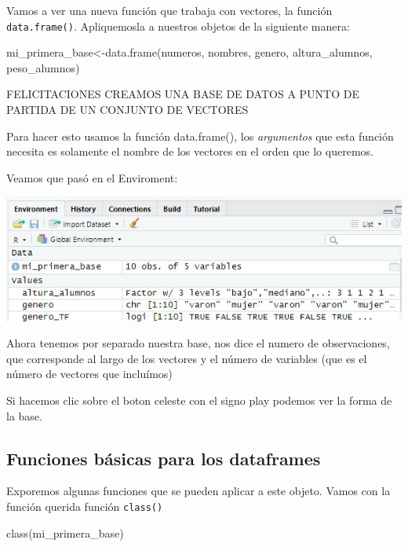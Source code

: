 \documentclass[
]{book}
\newenvironment{Shaded}{\begin{snugshade}}{\end{snugshade}}
\newcommand{\FunctionTok}[1]{\textcolor[rgb]{0.00,0.00,0.00}{#1}}
\newcommand{\NormalTok}[1]{#1}
\newcommand{\OtherTok}[1]{\textcolor[rgb]{0.56,0.35,0.01}{#1}}
\begin{document}
Vamos a ver una nueva función que trabaja con vectores, la función \texttt{data.frame()}.
Apliquemosla a nuestros objetos de la siguiente manera:

\begin{Shaded}
\begin{Highlighting}[]
\NormalTok{mi\_primera\_base}\OtherTok{\textless{}{-}}\FunctionTok{data.frame}\NormalTok{(numeros, nombres, genero, altura\_alumnos, peso\_alumnos)}
\end{Highlighting}
\end{Shaded}

FELICITACIONES CREAMOS UNA BASE DE DATOS A PUNTO DE PARTIDA DE UN CONJUNTO DE VECTORES

Para hacer esto usamos la función data.frame(), los \emph{argumentos} que esta función necesita es solamente el nombre de los vectores en el orden que lo queremos.

Veamos que pasó en el Enviroment:

\includegraphics[width=8.36in]{img/Rstudiofig6}

Ahora tenemos por separado nuestra base, nos dice el numero de observaciones, que corresponde al largo de los vectores y el número de variables (que es el número de vectores que incluímos)

Si hacemos clic sobre el boton celeste con el signo play podemos ver la forma de la base.

\hypertarget{funciones-buxe1sicas-para-los-dataframes}{%
\subsection{Funciones básicas para los dataframes}\label{funciones-buxe1sicas-para-los-dataframes}}

Exporemos algunas funciones que se pueden aplicar a este objeto.
Vamos con la función querida función \texttt{class()}

\begin{Shaded}
\begin{Highlighting}[]
\FunctionTok{class}\NormalTok{(mi\_primera\_base)}
\end{Highlighting}
\end{Shaded}
\end{document}

